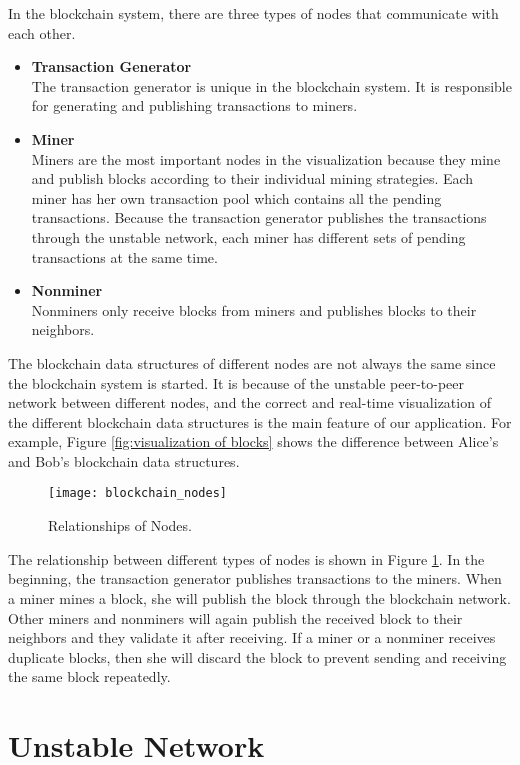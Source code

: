 In the blockchain system, there are three types of nodes that communicate with each other. 
\begin{itemize}
    \item \textbf{Transaction Generator} \\
        The transaction generator is unique in the blockchain system. It is responsible for generating and publishing transactions to miners.
    \item \textbf{Miner} \\
        Miners are the most important nodes in the visualization because they mine and publish blocks according to their individual mining strategies. Each miner has her own transaction pool which contains all the pending transactions. Because the transaction generator publishes the transactions through the unstable network, each miner has different sets of pending transactions at the same time.
    \item \textbf{Nonminer} \\
        Nonminers only receive blocks from miners and publishes blocks to their neighbors.
\end{itemize}

The blockchain data structures of different nodes are not always the same since the blockchain system is started. It is because of the unstable peer-to-peer network between different nodes, and the correct and real-time visualization of the different blockchain data structures is the main feature of our application. For example, Figure \ref{fig:visualization of blocks} shows the difference between Alice's and Bob's blockchain data structures.

\begin{figure}[htb]
    \centering
    \texttt{[image: blockchain\_nodes]}
    \caption{Relationships of Nodes.}
    \label{fig:relationship of nodes}
\end{figure}

The relationship between different types of nodes is shown in Figure \ref{fig:relationship of nodes}. In the beginning, the transaction generator publishes transactions to the miners. When a miner mines a block, she will publish the block through the blockchain network. Other miners and nonminers will again publish the received block to their neighbors and they validate it after receiving. If a miner or a nonminer receives duplicate blocks, then she will discard the block to prevent sending and receiving the same block repeatedly.

\section{Unstable Network}

